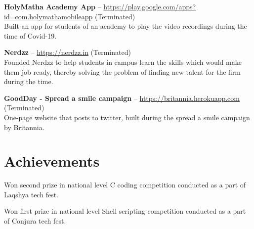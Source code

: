 \documentclass[11pt,a4paper]{moderncv}
\begin{document}
\cvlistitem
{\textbf{HolyMatha Academy App} -- {\small \href{https://play.google.com/store/apps/details?id=com.holymathamobileapp}{https://play.google.com/apps?id=com.holymathamobileapp}} (Terminated)
  \\Built an app for students of an academy to play the video recordings during the time of Covid-19.
}

\vspace{5pt}

\cvlistitem
{\textbf{Nerdzz} -- {\small \href{https://nerdzz.in}{https://nerdzz.in}} (Terminated)
  \\Founded Nerdzz to help students in campus learn the skills which would make them job ready, thereby solving the problem of finding new talent for the firm during the time.
}

\vspace{5pt}

\cvlistitem
{\textbf{GoodDay - Spread a smile campaign} -- {\small \href{https://britannia.herokuapp.com}{https://britannia.herokuapp.com}} (Terminated)
  \\One-page website that posts to twitter, built during the spread a smile campaign by Britannia.
}






\vspace{10pt}
\section{Achievements}

{Won second prize in national level C coding competition conducted as a part of Laqshya tech fest.}

{Won first prize in national level Shell scripting competition conducted as a part of Conjura tech fest.}


\end{document}
